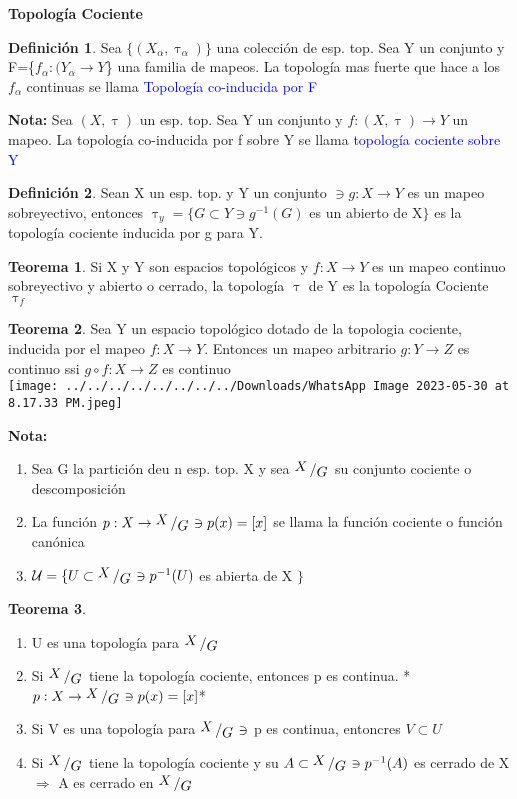 \documentclass{article}
\theoremstyle{definition}
\newtheorem{definition}{Definición}[section]
\newtheorem{theorem}{Teorema}[section]
\newcommand{\bigslant}[2]{{\raisebox{.2em}{$#1$}\left/\raisebox{-.2em}{$#2$}\right.}}
\begin{document}
\begin{LARGE}
	\textbf{Topología Cociente}
\end{LARGE}
\begin{definition}
	Sea $\{(X_{\alpha},\uptau_{\alpha})\}$ una colección de esp. top. Sea Y un conjunto y F=\{$f_{\alpha}:(Y_{\alpha}\to Y$\} una familia de mapeos. La topología mas fuerte que hace a los $f_{\alpha}$ continuas se llama \textcolor{blue}{Topología co-inducida por F}\label{Topologia coinducida}
\end{definition}
\textbf{Nota: } Sea $(X,\uptau)$ un esp. top. Sea Y un conjunto y $f:(X,\uptau)\to Y$ un mapeo. La topología co-inducida por f sobre Y se llama \textcolor{blue}{topología cociente sobre Y}\label{Top. cociente}
\begin{definition}
	Sean X un esp. top. y Y un conjunto $\ni g:X\to Y$ es un mapeo sobreyectivo, entonces $\uptau_y=\{G\subset Y\ni g^{-1}(G)$ es un abierto de X$\}$ es la topología cociente inducida por g para Y.
\end{definition}
\begin{theorem}
	Si X y Y son espacios topológicos y $f:X\to Y$ es un mapeo continuo sobreyectivo y abierto o cerrado, la topología $\uptau$ de Y es la topología Cociente $\uptau_f$
\end{theorem}
\begin{theorem}
	Sea Y un espacio topológico dotado de la topologia cociente, inducida por el mapeo $f:X\to Y$. Entonces un mapeo arbitrario $g:Y\to Z$ es continuo ssi $g\circ f:X\to Z$ es continuo\\
\texttt{[image: ../../../../../../../../Downloads/WhatsApp Image 2023-05-30 at 8.17.33 PM.jpeg]} 
\end{theorem}
\textbf{Nota: }\\
\begin{enumerate}
	\item Sea G la partición deu n esp. top. X y sea $\bigslant{X}{G}$ su conjunto cociente o descomposición
	\item La función $p: X\to \bigslant{X}{G}\ni p(x)=[x]$ se llama la función cociente o función canónica 
	\item $\mathcal{U}=\{U\subset\bigslant{X}{G}\ni p^{-1}(U)$ es abierta de X $\}$
\end{enumerate}
\begin{theorem}
\hfill
	\begin{enumerate}
		\item U es una topología para $\bigslant{X}{G}$
		\item Si $\bigslant{X}{G}$ tiene la topología cociente, entonces p es continua. *$p:X\to\bigslant{X}{G}\ni p(x)=[x]$*
		\item Si V es una topología para $\bigslant{X}{G}\ni$ p es continua, entoncres $V\subset U$
		\item Si $\bigslant{X}{G}$ tiene la topología cociente y su $A\subset \bigslant{X}{G}\ni p^{-1}(A)$ es cerrado de X $\Rightarrow$ A es cerrado en $\bigslant{X}{G}$
	\end{enumerate}
\end{theorem}
\end{document}
